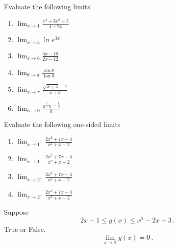 \documentclass[12pt]{amsart}
\begin{document}
\begin{question}
	Evaluate the following limits
	\begin{enumerate}
		\item $\displaystyle \lim_{x\to 1} \frac{ x^3 + 3x^2 + 5}{4 - 7x}$
		      \vspace{5cm}
		\item $\displaystyle \lim_{x\to 3} \ln e^{3x}$
		      \vspace{5cm}
		\item $\displaystyle \lim_{x \to 6} \frac{3x - 18}{2x - 12}$
		      \vspace{5cm}
		\item $\displaystyle \lim_{\theta \to \pi} \frac{\sin \theta}{\tan \theta}$
		      \vspace{5cm}
		\item $\displaystyle \lim_{x \to \pi} \frac{\sqrt{x + 4} - 1}{x + 3}$
		      \vspace{5cm}
		\item $\displaystyle \lim_{h \to 0} \frac{\frac{1}{a + h} - \frac{1}{a}}{h}$
		      \vspace{5cm}
	\end{enumerate}
\end{question}


\begin{question}
	Evaluate the following one-sided limits
	\begin{enumerate}
		\item $\displaystyle \lim_{x \to 1^+} \frac{2x^2 + 7x -4}{x^2 + x - 2}$
		      \vspace{5cm}
		\item $\displaystyle \lim_{x \to 1^-} \frac{2x^2 + 7x -4}{x^2 + x - 2}$
		      \vspace{5cm}
		\item $\displaystyle \lim_{x \to 2^+} \frac{2x^2 + 7x -4}{x^2 + x - 2}$
		      \vspace{5cm}
		\item $\displaystyle \lim_{x \to 2^-} \frac{2x^2 + 7x -4}{x^2 + x - 2}$
		      \vspace{5cm}
	\end{enumerate}
\end{question}

\begin{question}
	Suppose
	\begin{equation*}
		2x - 1 \leq g(x) \leq x^2 - 2x + 3 \,.
	\end{equation*}
	True or False.
	\begin{equation*}
		\lim_{x\to 2} g(x) = 0 \,.
	\end{equation*}
\end{question}
\end{document}
